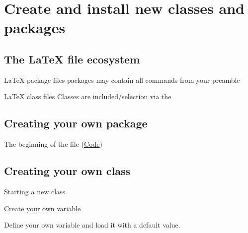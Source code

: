 \section{Create and install new classes and packages}

\subsection{The {\LaTeX} file ecosystem}
\begin{frame}
	\begin{block}{{\LaTeX} package files }
		packages may contain all commands from your preamble
	\end{block}
	\begin{block}{{\LaTeX} class files }
		Classes are included/selection via the 
	\end{block}
\end{frame}

\subsection{Creating your own package}
\begin{frame}
	\begin{codeblock}{The beginning of the  file
			\hfill {\tiny (\href{run:latex-course.sty}{Code})}}
		
	\end{codeblock}
\end{frame}

\subsection{Creating your own class}
\begin{frame}
	\begin{codeblock}{Starting a new class}
		
	\end{codeblock}
\end{frame}

\begin{frame}
	\begin{codeblock}{Create your own variable}
		
	\end{codeblock}
	Define your own variable and load it with a default value.
\end{frame}

